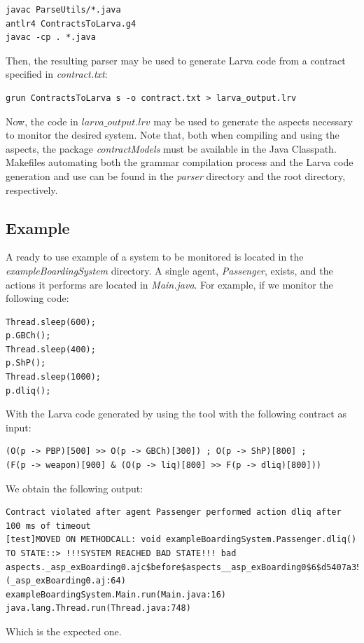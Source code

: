 \documentclass{article}
\begin{document}
\begin{verbatim}
javac ParseUtils/*.java
antlr4 ContractsToLarva.g4
javac -cp . *.java
\end{verbatim}

Then, the resulting parser may be used to generate Larva code from a contract specified in \textit{contract.txt}:

\begin{verbatim}
grun ContractsToLarva s -o contract.txt > larva_output.lrv
\end{verbatim}

Now, the code in \textit{$larva\_output.lrv$} may be used to generate the aspects necessary to monitor the desired system. Note that, both when compiling and using the aspects, the package \textit{contractModels} must be available in the Java Classpath. Makefiles automating both the grammar compilation process and the Larva code generation and use can be found in the \textit{parser} directory and the root directory, respectively.

\subsection{Example}
A ready to use example of a system to be monitored is located in the \textit{exampleBoardingSystem} directory. A single agent, \textit{Passenger}, exists, and the actions it performs are located in \textit{Main.java}. For example, if we monitor the following code:

\begin{verbatim}
Thread.sleep(600);
p.GBCh();
Thread.sleep(400);
p.ShP();
Thread.sleep(1000);
p.dliq();
\end{verbatim}

With the Larva code generated by using the tool with the following contract as input:

\begin{verbatim}
(O(p -> PBP)[500] >> O(p -> GBCh)[300]) ; O(p -> ShP)[800] ; 
(F(p -> weapon)[900] & (O(p -> liq)[800] >> F(p -> dliq)[800]))
\end{verbatim}

We obtain the following output:

\begin{verbatim}
Contract violated after agent Passenger performed action dliq after 
100 ms of timeout
[test]MOVED ON METHODCALL: void exampleBoardingSystem.Passenger.dliq() 
TO STATE::> !!!SYSTEM REACHED BAD STATE!!! bad
aspects._asp_exBoarding0.ajc$before$aspects__asp_exBoarding0$6$d5407a35
(_asp_exBoarding0.aj:64)
exampleBoardingSystem.Main.run(Main.java:16)
java.lang.Thread.run(Thread.java:748) 
\end{verbatim}

Which is the expected one.
\end{document}
